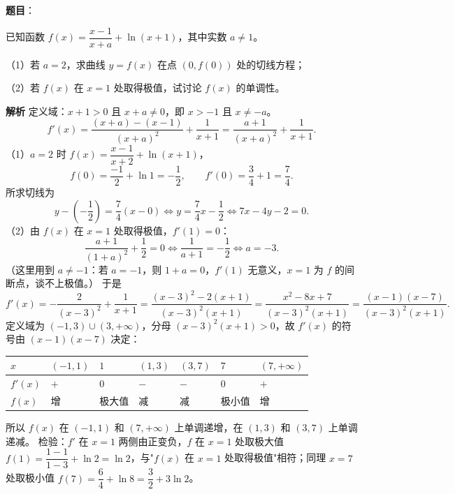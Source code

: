 \begin{answer}

\textbf{题目}：

已知函数 $f(x)=\dfrac{x-1}{x+a}+\ln(x+1)$，其中实数 $a\neq1$。

（1）若 $a=2$，求曲线 $y=f(x)$ 在点 $(0,f(0))$ 处的切线方程；

（2）若 $f(x)$ 在 $x=1$ 处取得极值，试讨论 $f(x)$ 的单调性。

\textbf{解析}
定义域：$x+1>0$ 且 $x+a\neq0$，即 $x>-1$ 且 $x\neq-a$。
\nopagebreak[4]
\[f'(x)=\frac{(x+a)-(x-1)}{(x+a)^2}+\frac{1}{x+1}=\frac{a+1}{(x+a)^2}+\frac{1}{x+1}.\]
（1）$a=2$ 时 $f(x)=\dfrac{x-1}{x+2}+\ln(x+1)$，
\nopagebreak[4]
\[f(0)=\frac{-1}{2}+\ln1=-\frac12,\qquad f'(0)=\frac{3}{4}+1=\frac74.\]
所求切线为
\nopagebreak[4]
\[y-\left(-\frac12\right)=\frac74(x-0)\iff y=\frac74x-\frac12\iff 7x-4y-2=0.\]
（2）由 $f(x)$ 在 $x=1$ 处取得极值，$f'(1)=0$：
\nopagebreak[4]
\[\frac{a+1}{(1+a)^2}+\frac12=0\iff\frac{1}{a+1}=-\frac12\iff a=-3.\]
（这里用到 $a\neq-1$：若 $a=-1$，则 $1+a=0$，$f'(1)$ 无意义，$x=1$ 为 $f$ 的间断点，谈不上极值。）
于是
\nopagebreak[4]
\[f'(x)=-\frac{2}{(x-3)^2}+\frac{1}{x+1}=\frac{(x-3)^2-2(x+1)}{(x-3)^2(x+1)}=\frac{x^2-8x+7}{(x-3)^2(x+1)}=\frac{(x-1)(x-7)}{(x-3)^2(x+1)}.\]
定义域为 $\left(-1,3\right)\cup\left(3,+\infty\right)$，分母 $(x-3)^2(x+1)>0$，故 $f'(x)$ 的符号由 $(x-1)(x-7)$ 决定：

\begin{center}
\begin{tabular}{lllllll}
\toprule
$x$ & $\left(-1,1\right)$ & $1$ & $\left(1,3\right)$ & $\left(3,7\right)$ & $7$ & $\left(7,+\infty\right)$ \\
\midrule
$f'(x)$ & $+$ & $0$ & $-$ & $-$ & $0$ & $+$ \\
$f(x)$ & 增 & 极大值 & 减 & 减 & 极小值 & 增 \\
\bottomrule
\end{tabular}
\end{center}

所以 $f(x)$ 在 $\left(-1,1\right)$ 和 $\left(7,+\infty\right)$ 上单调递增，在 $\left(1,3\right)$ 和 $\left(3,7\right)$ 上单调递减。
检验：$f'$ 在 $x=1$ 两侧由正变负，$f$ 在 $x=1$ 处取极大值 $f(1)=\dfrac{1-1}{1-3}+\ln2=\ln2$，与"$f(x)$ 在 $x=1$ 处取得极值"相符；同理 $x=7$ 处取极小值 $f(7)=\dfrac{6}{4}+\ln8=\dfrac32+3\ln2$。


\end{answer}
